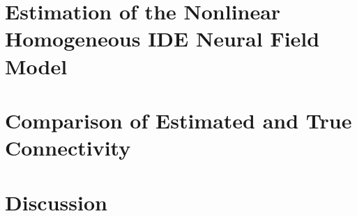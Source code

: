 \documentclass[onecolumn,draftcls]{IEEEtran}
\begin{document}
\section{Estimation of the Nonlinear Homogeneous IDE Neural Field Model}


\section{Comparison of Estimated and True Connectivity}

\section{Discussion}

%
%

%
%
%
\end{document}
